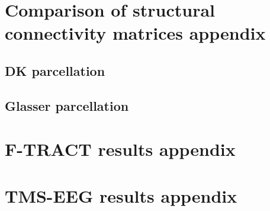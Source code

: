 \chapter{Comparison of structural connectivity matrices appendix}\label{appendix:compare_sc}

\section{DK parcellation}

\section{Glasser parcellation}

\chapter{F-TRACT results appendix}

\chapter{TMS-EEG results appendix}